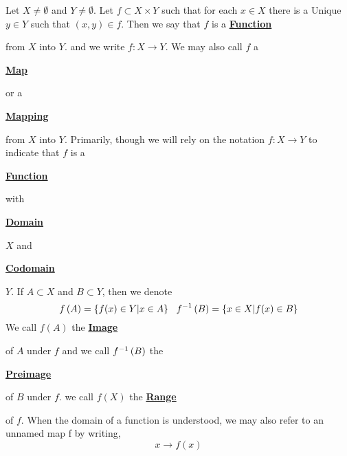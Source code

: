 \label{def:Function}
\newcommand{\Function}[0]{
    \textbf{\hyperref[def:Function]{Function}}
}
\newcommand{\Functions}[0]{
    \textbf{\hyperref[def:Function]{Functions}}
}
\newcommand{\Map}[0]{
    \textbf{\hyperref[def:Function]{Map}}
}
\newcommand{\Maps}[0]{
    \textbf{\hyperref[def:Function]{Maps}}
}
\newcommand{\Mapping}[0]{
    \textbf{\hyperref[def:Function]{Mapping}}
}
\newcommand{\Mappings}[0]{
    \textbf{\hyperref[def:Function]{Mappings}}
}

\newcommand{\FunctionDomain}[0]{
    \textbf{\hyperref[def:Function]{Domain}}
}
\newcommand{\FunctionDomains}[0]{
    \textbf{\hyperref[def:Function]{Domains}}
}
\newcommand{\FunctionCodomain}[0]{
    \textbf{\hyperref[def:Function]{Codomain}}
}
\newcommand{\FunctionCodomains}[0]{
    \textbf{\hyperref[def:Function]{Codomains}}
}
\newcommand{\FunctionRange}[0]{
    \textbf{\hyperref[def:Function]{Range}}
}
\newcommand{\FunctionRanges}[0]{
    \textbf{\hyperref[def:Function]{Ranges}}
}

\newcommand{\FunctionImage}[0]{
    \textbf{\hyperref[def:Function]{Image}}
}
\newcommand{\FunctionImages}[0]{
    \textbf{\hyperref[def:Function]{Images}}
}
\newcommand{\FunctionPreimage}[0]{
    \textbf{\hyperref[def:Function]{Preimage}}
}
\newcommand{\FunctionPreimages}[0]{
    \textbf{\hyperref[def:Function]{Preimages}}
}

\begin{df}[\Function]
    Let $X \neq \emptyset$ 
    and $Y \neq \emptyset$.
    Let $f \subset X \times Y$ 
    such that for each $x \in X$ 
    there is a Unique $y \in Y$ 
    such that 
    $(x,y) \in f$. 
    Then we say that $f$ 
    is a \Function
    from $X$ into $Y$. 
    and we write 
    $f:X \to Y$. 
    We may also call $f$ 
    a 
    \Map
    or a 
    \Mapping 
    from $X$ 
    into $Y$. 
    Primarily, though 
    we will rely on the notation 
    $f:X \to Y$ to indicate
    that 
    $f$ is a 
    \Function
    with 
    \FunctionDomain
    $X$
    and 
    \FunctionCodomain
    $Y$.
    If $A \subset X$ 
    and $B \subset Y$, 
    then we denote 
    \begin{equation*}
    f\left( A\right)= \{f(x)\in Y | x \in A\} \\
    \; \; \;
    f^{-1}\left( B\right) = \{x \in X | f(x) \in B \}
    \end{equation*}
    We call 
    $f(A)$ 
    the \FunctionImage
    of $A$ under $f$
    and we call
    $f^{-1}\left( B\right)$ 
    the 
    \FunctionPreimage
    of $B$ under
    $f$. 
    we call $f(X)$ 
    the \FunctionRange
    of $f$. 
    When the domain of a function is understood, we may also refer to an unnamed map
    f by writing, 
    \begin{equation*}
    x \to f(x)
    \end{equation*}
   
\end{df}
